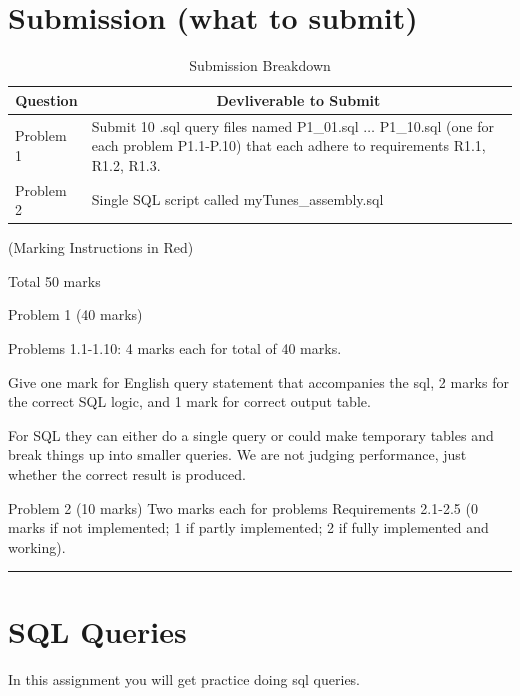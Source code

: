 \documentclass[12pt]{article}
\begin{document}
\section{Submission (what to submit)}
\begin{table}[H]
    \begin{center}
        \setlength{\tabcolsep}{15pt}
        \renewcommand{\arraystretch}{1.5}
        \begin{longtable}{|@{}p{}@{}|@{}p{}@{}|}
            \hline
            \multicolumn{1}{|c|}{\textbf{Question}} & \multicolumn{1}{|c|}{\textbf{Devliverable to Submit}} \\
            \hline
            Problem 1 & Submit 10 .sql query files named P1\_01.sql $\ldots$ P1\_10.sql (one for each problem P1.1-P.10) that each adhere to requirements R1.1, R1.2, R1.3. \\
            \hline
            Problem 2 & Single SQL script called myTunes\_assembly.sql\\
            \hline
        \end{longtable}
    \end{center}
    \caption{Submission Breakdown}
\end{table}

 {
    \color{red}
    (Marking Instructions in Red) \par
    Total 50 marks \par
    Problem 1 (40 marks) \par
    Problems 1.1-1.10: 4 marks each for total of 40 marks. \par 
    Give one mark for English query statement that accompanies the sql, 2 marks for the correct SQL logic, and 1 mark for correct output table. \par

    For SQL they can either do a single query or could make temporary tables and break things up into smaller queries. We are not judging performance, just whether the correct result is produced. \par

    Problem 2 (10 marks) Two marks each for problems Requirements 2.1-2.5 (0 marks if not implemented; 1 if partly implemented; 2 if fully implemented and working).
 }

\vspace{0.25cm}
\hrule

\section{SQL Queries}
In this assignment you will get practice doing sql queries. \par
\end{document}
